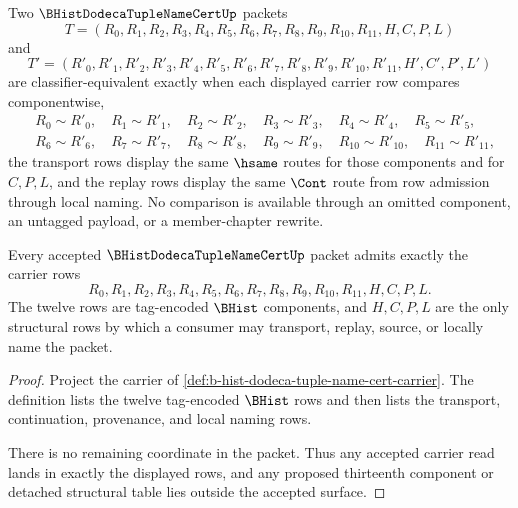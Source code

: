 \begin{definition}
\label{def:b-hist-dodeca-tuple-name-cert-classifier}
Two $\BHistDodecaTupleNameCertUp$ packets
$$
T=(R_0,R_1,R_2,R_3,R_4,R_5,R_6,R_7,R_8,R_9,R_{10},R_{11},H,C,P,L)
$$
and
$$
T'=(R'_0,R'_1,R'_2,R'_3,R'_4,R'_5,R'_6,R'_7,R'_8,R'_9,R'_{10},R'_{11},H',C',P',L')
$$
are classifier-equivalent exactly when each displayed carrier row compares componentwise,
$$
\begin{aligned}
&R_0 \sim R'_0,\quad R_1 \sim R'_1,\quad R_2 \sim R'_2,\quad R_3 \sim R'_3,\quad R_4 \sim R'_4,\quad R_5 \sim R'_5,\\
&R_6 \sim R'_6,\quad R_7 \sim R'_7,\quad R_8 \sim R'_8,\quad R_9 \sim R'_9,\quad R_{10} \sim R'_{10},\quad R_{11} \sim R'_{11},
\end{aligned}
$$
the transport rows display the same $\hsame$ routes for those components and for $C,P,L$, and the replay rows display the same $\Cont$ route from row admission through local naming. No comparison is available through an omitted component, an untagged payload, or a member-chapter rewrite.
\end{definition}

\begin{theorem}
\label{thm:b-hist-dodeca-tuple-name-cert-carrier-admission}
Every accepted $\BHistDodecaTupleNameCertUp$ packet admits exactly the carrier rows
$$
R_0,R_1,R_2,R_3,R_4,R_5,R_6,R_7,R_8,R_9,R_{10},R_{11},H,C,P,L.
$$
The twelve rows are tag-encoded $\BHist$ components, and $H,C,P,L$ are the only structural rows by which a consumer may transport, replay, source, or locally name the packet.
\end{theorem}
\begin{proof}
Project the carrier of \autoref{def:b-hist-dodeca-tuple-name-cert-carrier}. The definition lists the twelve tag-encoded $\BHist$ rows and then lists the transport, continuation, provenance, and local naming rows.

There is no remaining coordinate in the packet. Thus any accepted carrier read lands in exactly the displayed rows, and any proposed thirteenth component or detached structural table lies outside the accepted surface.
\end{proof}


